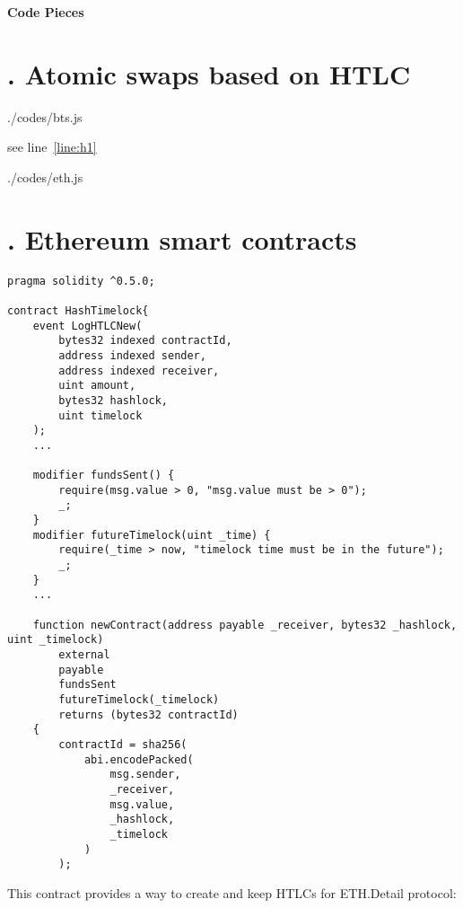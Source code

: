 \begin{huge}
\textbf{Code Pieces}
\end{huge}



\section{\uppercase\expandafter{}. Atomic swaps based on HTLC}

\begin{lstinputlisting}[language=JavaScript,  
						caption=Bitshares side, 	
						firstline = 10, 
						lastline = 50,
						escapechar=@]{./codes/bts.js}
\end{lstinputlisting}
see line~\ref{line:h1}

\begin{lstinputlisting}[language=JavaScript, 
						caption=Ethereum Side, 
						firstline=20,
						lastline=50]{./codes/eth.js}	
\end{lstinputlisting}

\section{\uppercase\expandafter{}. Ethereum smart contracts}
\label{sec:contract}


\begin{lstlisting}[language=Solidity, 
						caption = Create hash timelock contract example]
pragma solidity ^0.5.0;

contract HashTimelock{
    event LogHTLCNew(
        bytes32 indexed contractId,
        address indexed sender,
        address indexed receiver,
        uint amount,
        bytes32 hashlock,
        uint timelock
    );
	...
	
	modifier fundsSent() {
        require(msg.value > 0, "msg.value must be > 0");
        _;
    }
    modifier futureTimelock(uint _time) {
        require(_time > now, "timelock time must be in the future");
        _;
    }
    ...
    
    function newContract(address payable _receiver, bytes32 _hashlock, uint _timelock)
        external
        payable
        fundsSent
        futureTimelock(_timelock)
        returns (bytes32 contractId)
    {
        contractId = sha256(
            abi.encodePacked(
                msg.sender,
                _receiver,
                msg.value,
                _hashlock,
                _timelock
            )
        );

\end{lstlisting}
\noindent This contract provides a way to create and keep
HTLCs for ETH.\footnotemark[1] Detail protocol:

